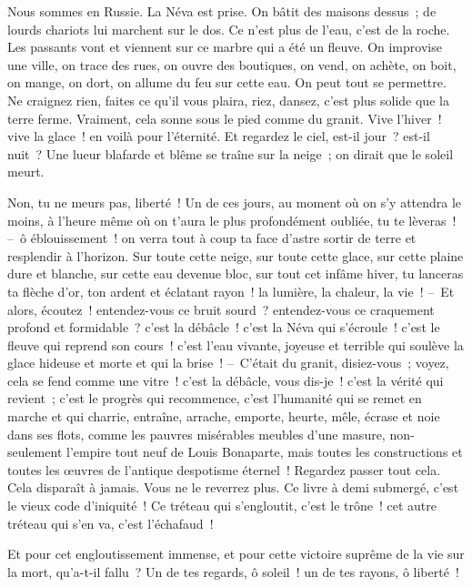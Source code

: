 \documentclass[french,twoside]{book} %
\begin{document}
\noindent Nous sommes en Russie. La Néva est prise. On bâtit des maisons dessus ; de lourds chariots lui marchent sur le dos. Ce n’est plus de l’eau, c’est de la roche. Les passants vont et viennent sur ce marbre qui a été un fleuve. On improvise une ville, on trace des rues, on ouvre des boutiques, on vend, on achète, on boit, on mange, on dort, on allume du feu sur cette eau. On peut tout se permettre. Ne craignez rien, faites ce qu’il vous plaira, riez, dansez, c’est plus solide que la terre ferme. Vraiment, cela sonne sous le pied comme du granit. Vive l’hiver ! vive la glace ! en voilà pour l’éternité. Et regardez le ciel, est-il jour ? est-il nuit ? Une lueur blafarde et blême se traîne sur la neige ; on dirait que le soleil meurt.\par
Non, tu ne meurs pas, liberté ! Un de ces jours, au moment où on s’y attendra le moins, à l’heure même où on t’aura le plus profondément oubliée, tu te lèveras ! – ô éblouissement ! on verra tout à coup ta face d’astre sortir de terre et resplendir à l’horizon. Sur toute cette neige, sur toute cette glace, sur cette plaine dure et blanche, sur cette eau devenue bloc, sur tout cet infâme hiver, tu lanceras ta flèche d’or, ton ardent et éclatant rayon ! la lumière, la chaleur, la vie ! – Et alors, écoutez ! entendez-vous ce bruit sourd ? entendez-vous ce craquement profond et formidable ? c’est la débâcle ! c’est la Néva qui s’écroule ! c’est le fleuve qui reprend son cours ! c’est l’eau vivante, joyeuse et terrible qui soulève la glace hideuse et morte et qui la brise ! – C’était du granit, disiez-vous ; voyez, cela se fend comme une vitre ! c’est la débâcle, vous dis-je ! c’est la vérité qui revient ; c’est le progrès qui recommence, c’est l’humanité qui se remet en marche et qui charrie, entraîne, arrache, emporte, heurte, mêle, écrase et noie dans ses flots, comme les pauvres misérables meubles d’une masure, non-seulement l’empire tout neuf de Louis Bonaparte, mais toutes les constructions et toutes les œuvres de l’antique despotisme éternel ! Regardez passer tout cela. Cela disparaît à jamais. Vous ne le reverrez plus. Ce livre à demi submergé, c’est le vieux code d’iniquité ! Ce tréteau qui s’engloutit, c’est le trône ! cet autre tréteau qui s’en va, c’est l’échafaud !\par
Et pour cet engloutissement immense, et pour cette victoire suprême de la vie sur la mort, qu’a-t-il fallu ? Un de tes regards, ô soleil ! un de tes rayons, ô liberté !
\end{document}
